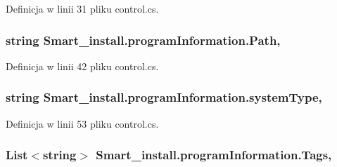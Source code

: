 Definicja w linii 31 pliku control.\+cs.

\hypertarget{class_smart__install_1_1program_information_a1dca0f827edc94e849c3e81a6bd48e5d}{
\subsubsection[{Path}]{\setlength{\rightskip}{0pt plus 5cm}string Smart\+\_\+install.\+program\+Information.\+Path\hspace{0.3cm}{\ttfamily [get]}, {\ttfamily [set]}}}\label{class_smart__install_1_1program_information_a1dca0f827edc94e849c3e81a6bd48e5d}


Definicja w linii 42 pliku control.\+cs.

\hypertarget{class_smart__install_1_1program_information_a571313df96dc58540427133224b32b72}{
\subsubsection[{system\+Type}]{\setlength{\rightskip}{0pt plus 5cm}string Smart\+\_\+install.\+program\+Information.\+system\+Type\hspace{0.3cm}{\ttfamily [get]}, {\ttfamily [set]}}}\label{class_smart__install_1_1program_information_a571313df96dc58540427133224b32b72}


Definicja w linii 53 pliku control.\+cs.

\hypertarget{class_smart__install_1_1program_information_a1d11c7b990ab03a56bec63af32ab2263}{
\subsubsection[{Tags}]{\setlength{\rightskip}{0pt plus 5cm}List$<$string$>$ Smart\+\_\+install.\+program\+Information.\+Tags\hspace{0.3cm}{\ttfamily [get]}, {\ttfamily [set]}}}\label{class_smart__install_1_1program_information_a1d11c7b990ab03a56bec63af32ab2263}


